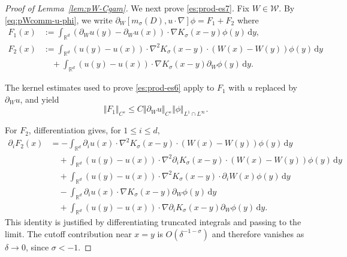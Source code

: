 \documentclass[reqno,11pt,a4paper]{amsart}
\newcommand{\R}{\ensuremath{\mathbb{R}}}
\newcommand{\dd}{\mathrm{d}}
\begin{document}
\begin{proof}[Proof of Lemma~\ref{lem:pW-Cgam}]

We next prove \eqref{es:prod-es7}.
Fix $W\in\mathcal W$.
By \eqref{eq:pWcomm-u-phi}, we write $\partial_W[m_\sigma(D),u\cdot\nabla]\phi
  =F_1+F_2$  
where
\begin{align*}
  F_1(x)
  &:=
  \int_{\R^d}
  (\partial_Wu(y)-\partial_Wu(x))
  \cdot\nabla K_\sigma(x-y)\phi(y)\,\dd y,
  \\
  F_2(x)
  &:=
  \int_{\R^d}
  (u(y)-u(x))\cdot\nabla^2K_\sigma(x-y)
  \cdot(W(x)-W(y))\phi(y)\,\dd y
  \\
  &\quad+
  \int_{\R^d}
  (u(y)-u(x))\cdot\nabla K_\sigma(x-y)
  \partial_W\phi(y)\,\dd y.
\end{align*}

The kernel estimates used to prove \eqref{es:prod-es6}
apply to $F_1$ with $u$ replaced by $\partial_Wu$,
and yield
\[
  \Vert F_1\Vert _{C^s}
  \leq
  C\Vert \partial_Wu\Vert _{C^s}\Vert \phi\Vert _{L^1\cap L^\infty}.
\]

For $F_2$, differentiation gives, for $1\leq i\leq d$,
\begin{equation}\label{eq:pWcomm-u-phi3}
\begin{aligned}
  \partial_iF_2(x)
  &=
  -\int_{\R^d}
  \partial_i u(x)\cdot\nabla^2K_\sigma(x-y)
  \cdot(W(x)-W(y))\phi(y)\,\dd y
  \\
  &\quad+
  \int_{\R^d}
  (u(y)-u(x))\cdot\nabla^2\partial_iK_\sigma(x-y)
  \cdot(W(x)-W(y))\phi(y)\,\dd y
  \\
  &\quad+
  \int_{\R^d}
  (u(y)-u(x))\cdot\nabla^2K_\sigma(x-y)
  \cdot\partial_iW(x)\phi(y)\,\dd y
  \\
  &\quad-
  \int_{\R^d}
  \partial_i u(x)\cdot\nabla K_\sigma(x-y)
  \partial_W\phi(y)\,\dd y
  \\
  &\quad+
  \int_{\R^d}
  (u(y)-u(x))\cdot\nabla\partial_iK_\sigma(x-y)
  \partial_W\phi(y)\,\dd y.
\end{aligned}
\end{equation}
This identity is justified by differentiating truncated
integrals and passing to the limit.
The cutoff contribution near $x=y$ is
$O(\delta^{-1-\sigma})$ and therefore vanishes
as $\delta\rightarrow0$, since $\sigma<-1$.


\end{proof}
\end{document}
